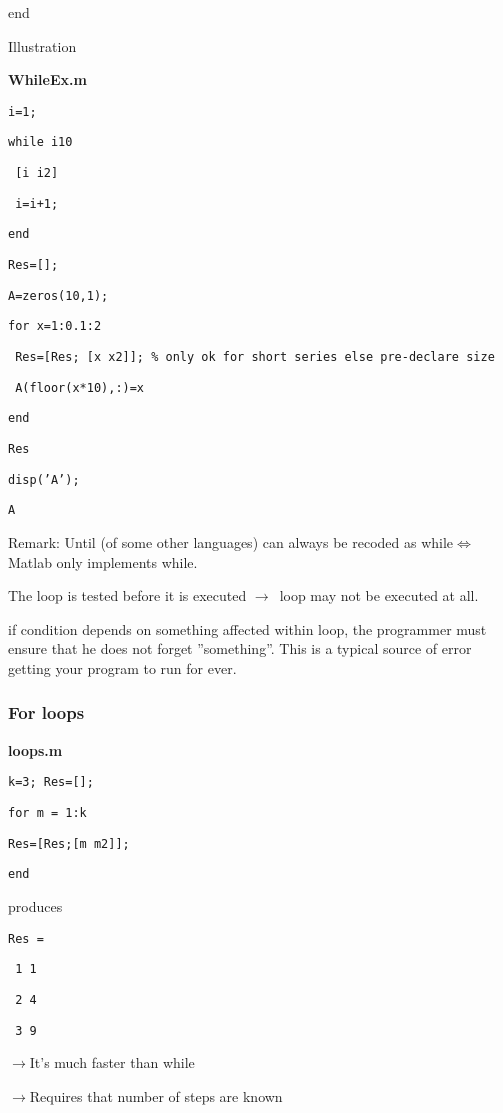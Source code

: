 \documentclass[12pt,a4paper]{article}
\begin{document}
end

Illustration

\textbf{WhileEx.m}

\texttt{i=1;}

\texttt{while i\TEXTsymbol{<}10}

\texttt{\ [i i2]}

\texttt{\ i=i+1;}

\texttt{end}

\texttt{Res=[];}

\texttt{A=zeros(10,1);}

\texttt{for x=1:0.1:2}

\texttt{\ Res=[Res; [x x2]]; \% only ok for short series else
pre-declare size}

\texttt{\ A(floor(x*10),:)=x}

\texttt{end}

\texttt{Res}

\texttt{disp('A');}

\texttt{A}

\bigskip

Remark: Until (of some other languages) can always be recoded as while$%
\Leftrightarrow $ Matlab only implements while.

The loop is tested before it is executed $\rightarrow $\ loop may not be
executed at all.

if condition depends on something affected within loop, the programmer must
ensure that he does not forget ''something''. This is a typical source of
error getting your program to run for ever.

\subsubsection{For loops}

\textbf{loops.m}

\texttt{k=3; Res=[];}

\texttt{for m = 1:k}

\texttt{\qquad Res=[Res;[m m2]];}

\texttt{end}

produces

\texttt{Res =}

\texttt{\ 1 1}

\texttt{\ 2 4}

\texttt{\ 3 9}

$\rightarrow $It's much faster than while

$\rightarrow $Requires that number of steps are known \ \ \ 
\end{document}
